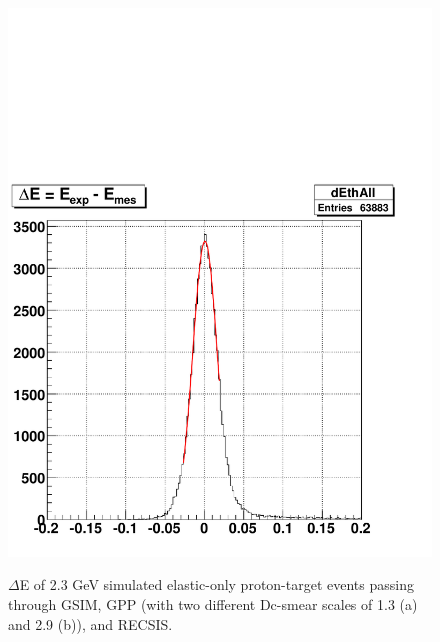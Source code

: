 \begin{figure}[H]
{\includegraphics[scale=0.32]{figuresEG4/DcSmear/dE_ThAllEb3_DcSmear2p9}%
\label{fig:dcSm2.9}
}
\label{fig:dcSmEff} %
\caption[$\Delta$E of reconstructed simulated events]{$\Delta$E of 2.3 GeV simulated elastic-only proton-target events passing through GSIM, GPP (with two different Dc-smear scales of 1.3 (a) and 2.9 (b)), and RECSIS.}
\end{figure}




